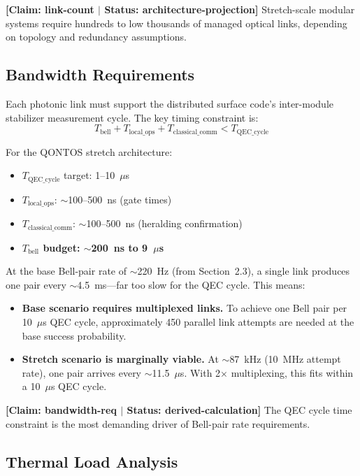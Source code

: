\documentclass[conference]{IEEEtran}
\begin{document}
\textbf{[Claim: link-count $|$ Status: architecture-projection]} Stretch-scale modular systems require hundreds to low thousands of managed optical links, depending on topology and redundancy assumptions.

\subsection{Bandwidth Requirements}

Each photonic link must support the distributed surface code's inter-module stabilizer measurement cycle. The key timing constraint is:
\begin{equation}
T_{\text{bell}} + T_{\text{local\_ops}} + T_{\text{classical\_comm}} < T_{\text{QEC\_cycle}}
\end{equation}

For the QONTOS stretch architecture:
\begin{itemize}
\item $T_{\text{QEC\_cycle}}$ target: 1--10~$\mu$s
\item $T_{\text{local\_ops}}$: $\sim$100--500~ns (gate times)
\item $T_{\text{classical\_comm}}$: $\sim$100--500~ns (heralding confirmation)
\item \textbf{$T_{\text{bell}}$ budget: $\sim$200~ns to 9~$\mu$s}
\end{itemize}

At the base Bell-pair rate of $\sim$220~Hz (from Section~2.3), a single link produces one pair every $\sim$4.5~ms---far too slow for the QEC cycle. This means:
\begin{itemize}
\item \textbf{Base scenario requires multiplexed links.} To achieve one Bell pair per 10~$\mu$s QEC cycle, approximately 450 parallel link attempts are needed at the base success probability.
\item \textbf{Stretch scenario is marginally viable.} At $\sim$87~kHz (10~MHz attempt rate), one pair arrives every $\sim$11.5~$\mu$s. With 2$\times$ multiplexing, this fits within a 10~$\mu$s QEC cycle.
\end{itemize}

\textbf{[Claim: bandwidth-req $|$ Status: derived-calculation]} The QEC cycle time constraint is the most demanding driver of Bell-pair rate requirements.

\subsection{Thermal Load Analysis}
\end{document}
